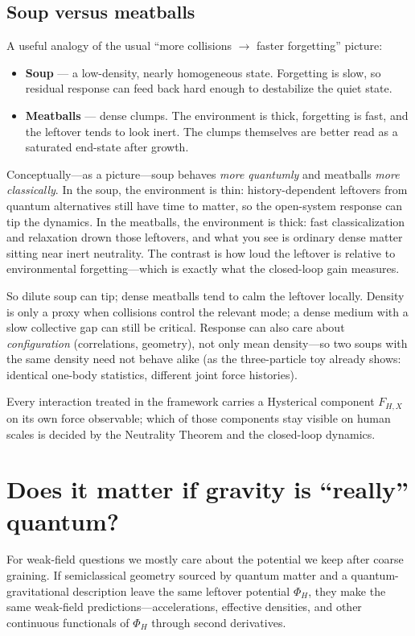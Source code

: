 \documentclass[11pt]{article}
\theoremstyle{remark}
\begin{document}
\subsection*{Soup versus meatballs}
A useful analogy of the usual ``more collisions $\to$ faster forgetting'' picture:
\begin{itemize}
\item \textbf{Soup} --- a low-density, nearly homogeneous state.
  Forgetting is slow, so residual response can feed back hard enough to destabilize the quiet state.
\item \textbf{Meatballs} --- dense clumps.
  The environment is thick, forgetting is fast, and the leftover tends to look inert.
  The clumps themselves are better read as a saturated end-state after growth.
\end{itemize}

Conceptually---as a picture---soup behaves \emph{more quantumly} and meatballs \emph{more classically}.
In the soup, the environment is thin: history-dependent leftovers from quantum alternatives still have time to matter, so the open-system response can tip the dynamics.
In the meatballs, the environment is thick: fast classicalization and relaxation drown those leftovers, and what you see is ordinary dense matter sitting near inert neutrality.
The contrast is how loud the leftover is relative to environmental forgetting---which is exactly what the closed-loop gain measures.

So dilute soup can tip; dense meatballs tend to calm the leftover locally.
Density is only a proxy when collisions control the relevant mode; a dense medium with a slow collective gap can still be critical.
Response can also care about \emph{configuration} (correlations, geometry), not only mean density---so two soups with the same density need not behave alike (as the three-particle toy already shows: identical one-body statistics, different joint force histories).

Every interaction treated in the framework carries a Hysterical component $F_{H,X}$ on its own force observable; which of those components stay visible on human scales is decided by the Neutrality Theorem and the closed-loop dynamics.

\section{Does it matter if gravity is ``really'' quantum?}
For weak-field questions we mostly care about the potential we keep after coarse graining.
If semiclassical geometry sourced by quantum matter and a quantum-gravitational description leave the same leftover potential $\Phi_H$, they make the same weak-field predictions---accelerations, effective densities, and other continuous functionals of $\Phi_H$ through second derivatives.
\end{document}
